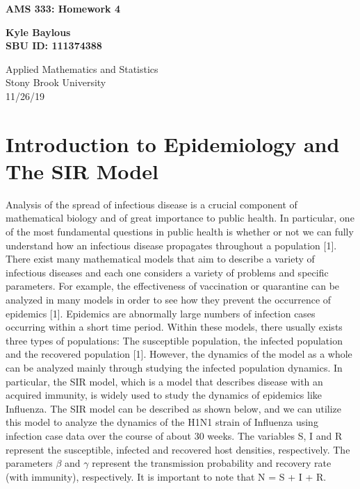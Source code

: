 \documentclass[12pt]{article}
\begin{document}
 

\begin{titlepage}
   \begin{center}
   
       \vspace*{1cm}
 
       \textbf{\Large{AMS 333: Homework 4}}
 
       \vspace{0.5cm}
 
       \vspace{1.5cm}
 
       \textbf{\Large{Kyle Baylous}}\\
       \vspace{1.5cm}
       \textbf{\Large{SBU ID: 111374388}}
 
       \vfill

 
       \vspace{0.8cm}
 
 
       Applied Mathematics and Statistics\\
       Stony Brook University\\
       11/26/19
 
   \end{center}
\end{titlepage}

\section{Introduction to Epidemiology and The SIR Model}

Analysis of the spread of infectious disease is a crucial component of mathematical biology and of great importance to public health. In particular, one of the most fundamental questions in public health is whether or not we can fully understand how an infectious disease propagates throughout a population [1]. There exist many mathematical models that aim to describe a variety of infectious diseases and each one considers a variety of problems and specific parameters. For example, the effectiveness of vaccination or quarantine can be analyzed in many models in order to see how they prevent the occurrence of epidemics [1]. Epidemics are abnormally large numbers of infection cases occurring within a short time period. Within these models, there usually exists three types of populations: The susceptible population, the infected population and the recovered population [1]. However, the dynamics of the model as a whole can be analyzed mainly through studying the infected population dynamics. In particular, the SIR model, which is a model that describes disease with an acquired immunity, is widely used to study the dynamics of epidemics like Influenza. The SIR model can be described as shown below, and we can utilize this model to analyze the dynamics of the H1N1 strain of Influenza using infection case data over the course of about 30 weeks. The variables S, I and R represent the susceptible, infected and recovered host densities, respectively. The parameters $\beta$ and $\gamma$ represent the transmission probability and recovery rate (with immunity), respectively. It is important to note that N = S + I + R. 
\end{document}
